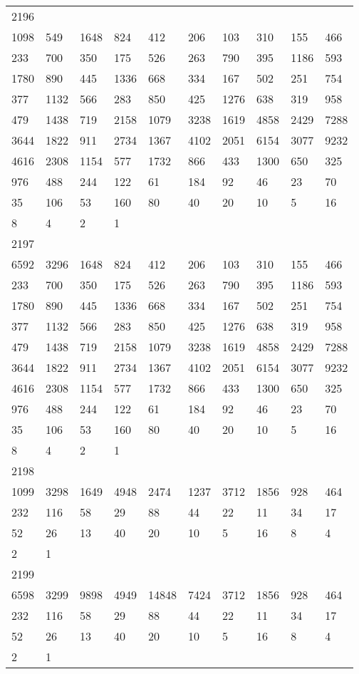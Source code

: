 \begin{longtable}{*{10}{l}}
2196&&&&&&&&&\\
1098& 549& 1648& 824& 412& 206& 103& 310& 155& 466\\
233& 700& 350& 175& 526& 263& 790& 395& 1186& 593\\
1780& 890& 445& 1336& 668& 334& 167& 502& 251& 754\\
377& 1132& 566& 283& 850& 425& 1276& 638& 319& 958\\
479& 1438& 719& 2158& 1079& 3238& 1619& 4858& 2429& 7288\\
3644& 1822& 911& 2734& 1367& 4102& 2051& 6154& 3077& 9232\\
4616& 2308& 1154& 577& 1732& 866& 433& 1300& 650& 325\\
976& 488& 244& 122& 61& 184& 92& 46& 23& 70\\
35& 106& 53& 160& 80& 40& 20& 10& 5& 16\\
8& 4& 2& 1& \\

2197&&&&&&&&&\\
6592& 3296& 1648& 824& 412& 206& 103& 310& 155& 466\\
233& 700& 350& 175& 526& 263& 790& 395& 1186& 593\\
1780& 890& 445& 1336& 668& 334& 167& 502& 251& 754\\
377& 1132& 566& 283& 850& 425& 1276& 638& 319& 958\\
479& 1438& 719& 2158& 1079& 3238& 1619& 4858& 2429& 7288\\
3644& 1822& 911& 2734& 1367& 4102& 2051& 6154& 3077& 9232\\
4616& 2308& 1154& 577& 1732& 866& 433& 1300& 650& 325\\
976& 488& 244& 122& 61& 184& 92& 46& 23& 70\\
35& 106& 53& 160& 80& 40& 20& 10& 5& 16\\
8& 4& 2& 1& \\

2198&&&&&&&&&\\
1099& 3298& 1649& 4948& 2474& 1237& 3712& 1856& 928& 464\\
232& 116& 58& 29& 88& 44& 22& 11& 34& 17\\
52& 26& 13& 40& 20& 10& 5& 16& 8& 4\\
2& 1& \\

2199&&&&&&&&&\\
6598& 3299& 9898& 4949& 14848& 7424& 3712& 1856& 928& 464\\
232& 116& 58& 29& 88& 44& 22& 11& 34& 17\\
52& 26& 13& 40& 20& 10& 5& 16& 8& 4\\
2& 1& \\


\end{longtable}
